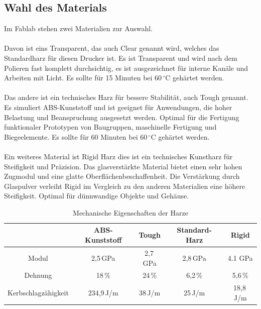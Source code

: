 \documentclass{\basedir/fablab-document}
\begin{document}
\subsection{Wahl des Materials}

Im Fablab stehen zwei Materialien zur Auswahl.\\
\\
Davon ist eins Transparent, das auch Clear genannt wird, welches das Standardharz für diesen Drucker ist. Es ist Transparent und wird nach dem Polieren fast komplett durchsichtig, es ist ausgezeichnet für interne Kanäle und Arbeiten mit Licht. Es sollte für 15 Minuten bei 60\,$^\circ$C gehärtet werden.\\
\\
Das andere ist ein technisches Harz für bessere Stabilität, auch Tough genannt. Es simuliert ABS-Kunststoff und ist geeignet für Anwendungen, die hoher Belastung und Beanspruchung ausgesetzt werden. Optimal für die Fertigung funktionaler Prototypen von Baugruppen, maschinelle Fertigung und Biegeelemente. Es sollte für 60 Minuten bei 60\,$^\circ$C gehärtet werden.\\
\\ 
Ein weiteres Material ist Rigid Harz dies ist ein technisches Kunstharz für Steifigkeit und Präzision. Das glasverstärkte Material bietet einen sehr hohen Zugmodul und eine glatte Oberflächenbeschaffenheit. Die Verstärkung durch Glaspulver verleiht Rigid im Vergleich zu den anderen Materialien eine höhere Steifigkeit. Optimal für dünnwandige Objekte und Gehäuse. 

\begin{table} [H]
	\centering
	\begin{tabular}{|c||c|c|c|c|}\hline
		 & ABS-Kunststoff & Tough & Standard-Harz & Rigid\\ \hline\hline
		Modul & 2,5\,GPa & 2,7\,GPa & 2,8\,GPa & 4.1 GPa\\ \hline
		Dehnung & 18\,\% & 24\,\% &  6,2\,\% & 5,6\,\% \\ \hline
		Kerbschlagzähigkeit & 234,9\,J/m & 38\,J/m & 25\,J/m & 18,8\,J/m\\ \hline
	\end{tabular}
	\caption{Mechanische Eigenschaften der Harze}
	\label{table:MechEigenschaften}
\end{table}
\end{document}
